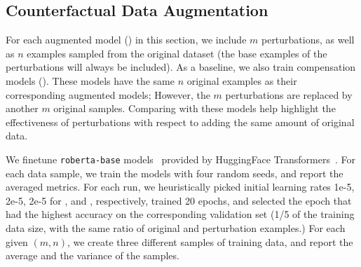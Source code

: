 \subsection{Counterfactual Data Augmentation}

For each augmented model (\maug) in this section, we include $m$ perturbations, as well as $n$ examples sampled from the original dataset (the base examples of the perturbations will always be included).
As a baseline, we also train compensation models (\mcomp).
These models have the same $n$ original examples as their corresponding augmented models; However, the $m$ perturbations are replaced by another $m$ original samples.
Comparing with these models help highlight the effectiveness of perturbations with respect to adding the same amount of original data. 

We finetune \texttt{roberta-base} models~\cite{liu2019roberta} provided by HuggingFace Transformers~\cite{Wolf2019HuggingFacesTS}.
For each data sample, we train the models with four random seeds, and report the averaged metrics. 
For each run, we heuristically picked initial learning rates 1e-5, 2e-5, 2e-5 for \sst, \nli and \qqp, respectively, trained 20 epochs, and selected the epoch that had the highest accuracy on the corresponding validation set (1/5 of the training data size, with the same ratio of original and perturbation examples.)
For each given $(m,n)$, we create three different samples of training data, and report the average and the variance of the samples. 

